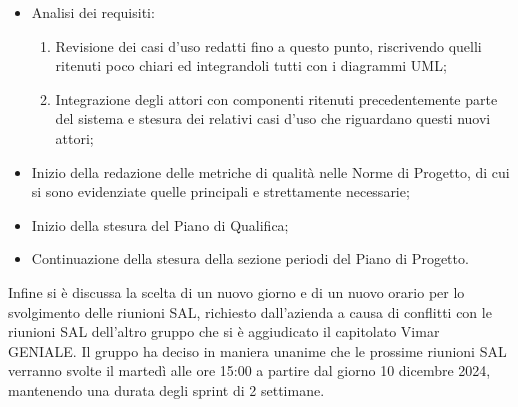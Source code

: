 \begin{itemize}
    \item Analisi dei requisiti:
    \begin{enumerate}
        \item Revisione dei casi d'uso redatti fino a questo punto, riscrivendo quelli ritenuti poco chiari ed integrandoli tutti con i diagrammi UML;
        \item Integrazione degli attori con componenti ritenuti precedentemente parte del sistema e stesura dei relativi casi d'uso che riguardano questi nuovi attori;
    \end{enumerate}
    \item Inizio della redazione delle metriche di qualità nelle Norme di Progetto, di cui si sono evidenziate quelle principali e strettamente necessarie;
    \item Inizio della stesura del Piano di Qualifica;
    \item Continuazione della stesura della sezione periodi del Piano di Progetto.
\end{itemize}
Infine si è discussa la scelta di un nuovo giorno e di un nuovo orario per lo svolgimento delle riunioni SAL, richiesto dall'azienda a causa di conflitti con le riunioni SAL dell'altro gruppo che si è aggiudicato il capitolato Vimar GENIALE. Il gruppo ha deciso in maniera unanime che le prossime riunioni SAL verranno svolte il martedì alle ore 15:00 a partire dal giorno 10 dicembre 2024, mantenendo una durata degli sprint di 2 settimane.